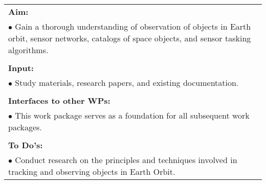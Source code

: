 \begin{table}[!h]
\begin{center}
\begin{tabular}{|p{35mm}||p{55mm}|p{50mm}||p{40mm}|}
      \hline\hline
      \multicolumn{4}{|p{150mm}|}{\textbf{Aim:}}                                                                                                                                                            \\
      \multicolumn{4}{|p{150mm}|}{$\bullet$ Gain a thorough understanding of observation of objects in Earth orbit, sensor networks, catalogs of space objects, and sensor tasking algorithms.}                                                   \\
      \multicolumn{4}{|p{150mm}|}{}                                                                                                                                                                           \\
      \multicolumn{4}{|p{150mm}|}{\textbf{Input:}}                                                                                                                                                            \\
      \multicolumn{4}{|p{150mm}|}{$\bullet$ Study materials, research papers, and existing documentation.}                                                                                                                                 \\
      \multicolumn{4}{|p{150mm}|}{}                                                                                                                                                                           \\
      \multicolumn{4}{|p{150mm}|}{\textbf{Interfaces to other WPs:}}                                                                                                                                    \\
      \multicolumn{4}{|p{150mm}|}{$\bullet$ This work package serves as a foundation for all subsequent work packages.}                                                                                              \\
      \multicolumn{4}{|p{150mm}|}{}                                                                                                                                                                           \\
      \multicolumn{4}{|p{150mm}|}{\textbf{To Do's:}}                                                                                                                                                         \\
      \multicolumn{4}{|p{150mm}|}{$\bullet$ Conduct research on the principles and techniques involved in tracking and observing objects in Earth Orbit.}\\

\end{tabular}
\end{center}
\end{table}
